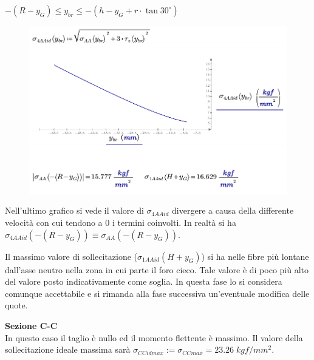 $- \left( R - y_G \right) \leq y_{br} \leq - \left( h - y_G + r \cdot \tan 30^{\circ} \right)$
\begin{figure}[H]
\centering
  \includegraphics[width=.7\textwidth]{imgs/MathAsse9_5}
\caption{}
\label{fig:MathAsse9_5}
\end{figure}


Nell'ultimo grafico si vede il valore di $\sigma_{4AAid}$ divergere a causa della differente velocità con cui tendono a $0$ i termini coinvolti.
In realtà si ha $\sigma_{4AAid}\left(-\left(R-y_G \right) \right) \equiv \sigma_{AA}\left(-\left(R-y_G \right) \right)$.

Il massimo valore di sollecitazione ($\sigma_{1AAid}\left(H+y_G \right)$) si ha nelle fibre più lontane dall'asse neutro nella zona in cui parte il foro cieco. 
Tale valore è di poco più alto del valore posto indicativamente come soglia.
In questa fase lo si considera comunque accettabile e si rimanda alla fase successiva un'eventuale modifica delle quote. 

\textbf{Sezione C-C}\\[1mm]
In questo caso il taglio è nullo ed il momento flettente è massimo. 
Il valore della sollecitazione ideale massima sarà $\sigma_{CCidmax} := \sigma_{CCmax} = 23.26 \;kgf/mm^2$.

